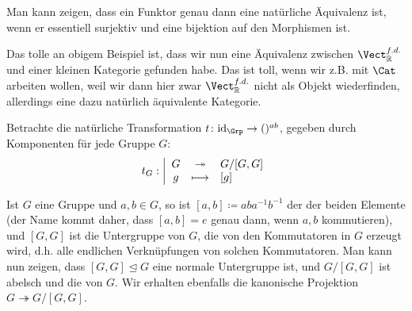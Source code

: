     \begin{oral}
        Man kann zeigen, dass ein Funktor genau dann eine natürliche Äquivalenz ist, wenn er essentiell surjektiv  und eine bijektion auf den Morphismen ist.
    \end{oral}

\begin{oral}
    Das tolle an obigem Beispiel ist, dass wir nun eine Äquivalenz zwischen $\Vect_{\R}^{f.d.}$ und einer kleinen Kategorie gefunden habe. Das ist toll, wenn wir z.B. mit $\Cat$ arbeiten wollen, weil wir dann hier zwar  $\Vect_{\R}^{f.d.}$ nicht als Objekt wiederfinden, allerdings eine dazu natürlich äquivalente Kategorie.
\end{oral}

\begin{example}
    Betrachte die natürliche Transformation $t\colon \id_{\Grp} \to  ()^{ab}$, gegeben durch Komponenten für jede Gruppe $G$:
        \begin{equation*}
        t_G: \left| \begin{array}{c c l} 
            G & \twoheadrightarrow & G / [G,G] \\
            g & \longmapsto &  [g]
        \end{array} \right.
    \end{equation*}
\end{example}

\begin{recap}
    Ist $G$ eine Gruppe und  $a,b\in G$, so ist $[a,b] \coloneqq  aba^{-1}b^{-1}$ der  der beiden Elemente (der Name kommt daher, dass $[a,b] = e$ genau dann, wenn  $a,b$ kommutieren), und  $[G,G]$ ist die Untergruppe von  $G$, die von den Kommutatoren in $G$ erzeugt wird, d.h. alle endlichen Verknüpfungen von solchen Kommutatoren. Man kann nun zeigen, dass $[G,G]\unlhd G$ eine normale Untergruppe ist, und  $G / [G,G]$ ist abelsch und die   von $G$. Wir erhalten ebenfalls die kanonische Projektion $G \twoheadrightarrow G / [G,G]$.
\end{recap}

